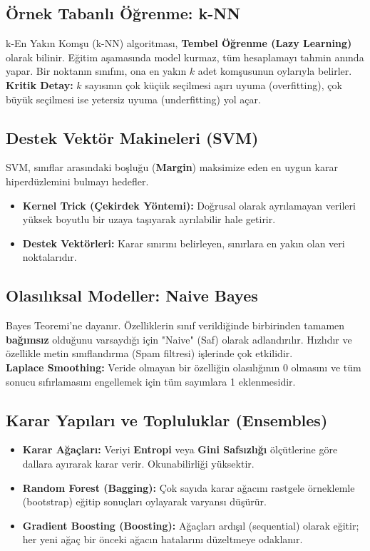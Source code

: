 \documentclass[12pt,a4paper]{article}
\begin{document}
\subsection{Örnek Tabanlı Öğrenme: k-NN}
k-En Yakın Komşu (k-NN) algoritması, \textbf{Tembel Öğrenme (Lazy Learning)} olarak bilinir. Eğitim aşamasında model kurmaz, tüm hesaplamayı tahmin anında yapar. Bir noktanın sınıfını, ona en yakın $k$ adet komşusunun oylarıyla belirler.
\\ \textbf{Kritik Detay:} $k$ sayısının çok küçük seçilmesi aşırı uyuma (overfitting), çok büyük seçilmesi ise yetersiz uyuma (underfitting) yol açar.

\subsection{Destek Vektör Makineleri (SVM)}
SVM, sınıflar arasındaki boşluğu (\textbf{Margin}) maksimize eden en uygun karar hiperdüzlemini bulmayı hedefler.
\begin{itemize}
    \item \textbf{Kernel Trick (Çekirdek Yöntemi):} Doğrusal olarak ayrılamayan verileri yüksek boyutlu bir uzaya taşıyarak ayrılabilir hale getirir.
    \item \textbf{Destek Vektörleri:} Karar sınırını belirleyen, sınırlara en yakın olan veri noktalarıdır.
\end{itemize}

\subsection{Olasılıksal Modeller: Naive Bayes}
Bayes Teoremi'ne dayanır. Özelliklerin sınıf verildiğinde birbirinden tamamen \textbf{bağımsız} olduğunu varsaydığı için "Naive" (Saf) olarak adlandırılır. Hızlıdır ve özellikle metin sınıflandırma (Spam filtresi) işlerinde çok etkilidir.
\\ \textbf{Laplace Smoothing:} Veride olmayan bir özelliğin olasılığının 0 olmasını ve tüm sonucu sıfırlamasını engellemek için tüm sayımlara 1 eklenmesidir.

\subsection{Karar Yapıları ve Topluluklar (Ensembles)}
\begin{itemize}
    \item \textbf{Karar Ağaçları:} Veriyi \textbf{Entropi} veya \textbf{Gini Safsızlığı} ölçütlerine göre dallara ayırarak karar verir. Okunabilirliği yüksektir.
    \item \textbf{Random Forest (Bagging):} Çok sayıda karar ağacını rastgele örneklemle (bootstrap) eğitip sonuçları oylayarak varyansı düşürür.
    \item \textbf{Gradient Boosting (Boosting):} Ağaçları ardışıl (sequential) olarak eğitir; her yeni ağaç bir önceki ağacın hatalarını düzeltmeye odaklanır.
\end{itemize}
\end{document}
